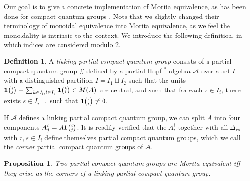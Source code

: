 \documentclass[11pt]{article}
\newcommand{\Grt}[3]{#1{\tiny {\begin{pmatrix} #2\\#3\end{pmatrix}}}}
\newcommand{\UnitC}[2]{\Grt{\mathbf{1}}{#1}{#2}}
\newtheorem{Prop}[Theorem]{Proposition}
\theoremstyle{definition}
\newtheorem{Def}[Theorem]{Definition}
\numberwithin{equation}{section}
\begin{document}
Our goal is to give a concrete implementation of Morita equivalence, as has been done for compact quantum groups \cite{BDV1}. Note that we slightly changed their terminology of monoidal equivalence into Morita equivalence, as we feel the monoidality is intrinsic to the context. We introduce the following definition, in which indices are considered modulo 2. 

\begin{Def} A \emph{linking partial compact quantum group} consists of a partial compact quantum group $\mathscr{G}$ defined by a partial Hopf $^*$-algebra $\mathscr{A}$ over a set $I$ with a distinguished partition $I = I_1\sqcup I_2$ such that the units $\UnitC{i}{j} = \sum_{k\in I_i,l\in I_j} \UnitC{k}{l} \in M(A)$ are central, and such that for each $r\in I_i$, there exists $s\in I_{i+1}$ such that $\UnitC{r}{s}\neq 0$.
\end{Def}

If $\mathscr{A}$ defines a linking partial compact quantum group, we can split $A$ into four components $A^i_j = A\UnitC{i}{j}$. It is readily verified that the $A^i_i$ together with all $\Delta_{rs}$ with $r,s \in I_i$ define themselves partial compact quantum groups, which we call the \emph{corner} partial compact quantum groups of $\mathscr{A}$. 

\begin{Prop} Two partial compact quantum groups are Morita equivalent iff they arise as the corners of a linking partial compact quantum group.
\end{Prop}
\end{document}
